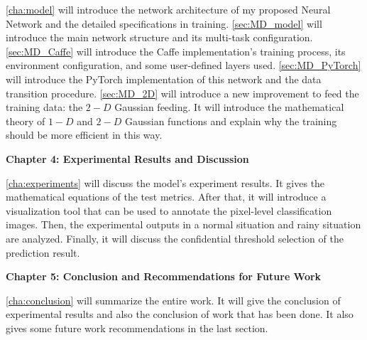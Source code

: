 \begin{spacing}{1.5}
\autoref{cha:model} will introduce the network architecture of my proposed Neural Network and the detailed specifications in training. \autoref{sec:MD_model} will introduce the main network structure and its multi-task configuration. \autoref{sec:MD_Caffe} will introduce the Caffe implementation's training process, its environment configuration, and some user-defined layers used. \autoref{sec:MD_PyTorch} will introduce the PyTorch implementation of this network and the data transition procedure. \autoref{sec:MD_2D} will introduce a new improvement to feed the training data: the $2-D$ Gaussian feeding. It will introduce the mathematical theory of $1-D$ and $2-D$ Gaussian functions and explain why the training should be more efficient in this way.

{\large\textbf{Chapter 4: Experimental Results and Discussion}}

 \autoref{cha:experiments} will discuss the model's experiment results. It gives the mathematical equations of the test metrics. After that, it will introduce a visualization tool that can be used to annotate the pixel-level classification images. Then, the experimental outputs in a normal situation and rainy situation are analyzed. Finally, it will discuss the confidential threshold selection of the prediction result.

{\large\textbf{Chapter 5: Conclusion and Recommendations for Future Work}}

\autoref{cha:conclusion} will summarize the entire work. It will give the conclusion of experimental results and also the conclusion of work that has been done. It also gives some future work recommendations in the last section.

\end{spacing}
\newpage


